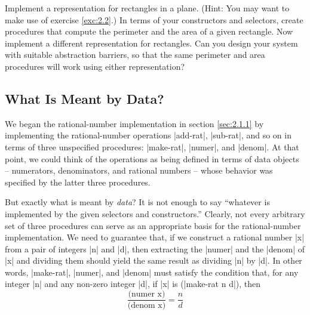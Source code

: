 \begin{Exercise}
\label{exc:2.3}
Implement a representation for rectangles in a plane.  (Hint: You may
want to make use of exercise \ref{exc:2.2}.)  In terms of your
constructors and selectors, create procedures that compute the
perimeter and the area of a given rectangle.  Now implement a
different representation for rectangles.  Can you design your system
with suitable abstraction barriers, so that the same perimeter and
area procedures will work using either representation?
\end{Exercise}




\subsection{What Is Meant by Data?}
\label{sec:2.1.3}



We began the rational-number implementation in
section \ref{sec:2.1.1} by implementing the rational-number
operations \scheme|add-rat|, \scheme|sub-rat|, and so on in terms of three
unspecified procedures: \scheme|make-rat|, \scheme|numer|, and \scheme|denom|.
At that point, we could think of the operations as being defined in
terms of data objects -- numerators, denominators, and rational
numbers -- whose behavior was specified by the latter three procedures.

But exactly what is meant by \textit{data}?  It is not enough to say
``whatever is implemented by the given selectors and constructors.''
Clearly, not every arbitrary set of three procedures can serve as an
appropriate basis for the rational-number implementation.  We need to
guarantee that, if we construct a rational number \scheme|x| from a
pair of integers \scheme|n| and \scheme|d|, then extracting the
\scheme|numer| and the \scheme|denom| of \scheme|x| and dividing them
should yield the same result as dividing \scheme|n| by \scheme|d|.  In
other words, \scheme|make-rat|, \scheme|numer|, and \scheme|denom|
must satisfy the condition that, for any integer \scheme|n| and any
non-zero integer \scheme|d|, if \scheme|x| is (\scheme|make-rat n d|),
then \[ \frac{\text{(numer x)}}{\text{(denom x)}} = \frac{n}{d} \]

